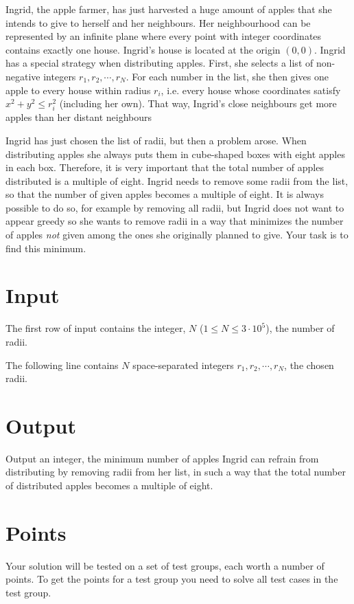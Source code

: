\def\version{1}

Ingrid, the apple farmer, has just harvested a huge amount of apples that she intends to give
to herself and her neighbours. Her neighbourhood can be represented by an infinite plane
where every point with integer coordinates contains exactly one house. Ingrid's house is
located at the origin $(0, 0)$. Ingrid has a special strategy when distributing apples. First, she
selects a list of non-negative integers $r_1, r_2, \cdots, r_N$. For each number in the list, she then
gives one apple to every house within radius $r_i$, i.e. every house whose coordinates satisfy $x^2+y^2 \leq r_i^2$
(including her own). That way, Ingrid's close neighbours get more apples than
her distant neighbours

Ingrid has just chosen the list of radii, but then a problem arose. When distributing apples
she always puts them in cube-shaped boxes with eight apples in each box. Therefore, it is
very important that the total number of apples distributed is a multiple of eight. Ingrid needs
to remove some radii from the list, so that the number of given apples becomes a multiple of
eight. It is always possible to do so, for example by removing all radii, but Ingrid does not
want to appear greedy so she wants to remove radii in a way that minimizes the number of
apples \textit{not} given among the ones she originally planned to give. Your task is to find this
minimum.

\section*{Input}
\noindent
The first row of input contains the integer, $N$ ($1 \leq N \leq 3 \cdot 10^5$), the number of radii.

The following line contains $N$ space-separated integers $r_1, r_2, \cdots, r_N$, the chosen radii.

\section*{Output}
\noindent
Output an integer, the minimum number of apples Ingrid can refrain from distributing by
removing radii from her list, in such a way that the total number of distributed apples
becomes a multiple of eight.

\section*{Points}
\noindent
Your solution will be tested on a set of test groups, each worth a number of points.
To get the points for a test group you need to solve all test cases in the test group.

